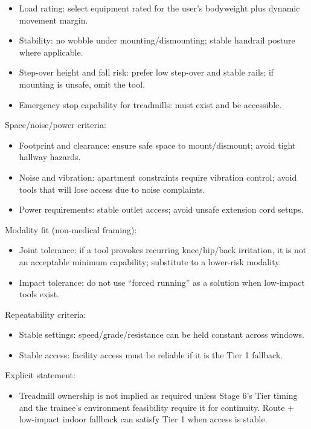 \documentclass[10pt]{article}
\begin{document}
\begin{itemize}
\item Load rating: select equipment rated for the user’s bodyweight plus dynamic movement margin.
\item Stability: no wobble under mounting/dismounting; stable handrail posture where applicable.
\item Step-over height and fall risk: prefer low step-over and stable rails; if mounting is unsafe, omit the tool.
\item Emergency stop capability for treadmills: must exist and be accessible.
\end{itemize}

Space/noise/power criteria:

\begin{itemize}
\item Footprint and clearance: ensure safe space to mount/dismount; avoid tight hallway hazards.
\item Noise and vibration: apartment constraints require vibration control; avoid tools that will lose access due to noise complaints.
\item Power requirements: stable outlet access; avoid unsafe extension cord setups.
\end{itemize}

Modality fit (non-medical framing):

\begin{itemize}
\item Joint tolerance: if a tool provokes recurring knee/hip/back irritation, it is not an acceptable minimum capability; substitute to a lower-risk modality.
\item Impact tolerance: do not use “forced running” as a solution when low-impact tools exist.
\end{itemize}

Repeatability criteria:

\begin{itemize}
\item Stable settings: speed/grade/resistance can be held constant across windows.
\item Stable access: facility access must be reliable if it is the Tier 1 fallback.
\end{itemize}

Explicit statement:

\begin{itemize}
\item Treadmill ownership is not implied as required unless Stage 6’s Tier timing and the trainee’s environment feasibility require it for continuity. Route + low-impact indoor fallback can satisfy Tier 1 when access is stable.
\end{itemize}
\end{document}
